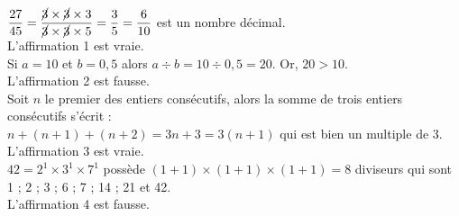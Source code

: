 \ \\ [-5mm]
   $\dfrac{27}{45} =\dfrac{\cancel{3}\times\cancel{3}\times3}{\cancel{3}\times\cancel{3}\times5} =\dfrac35 =\dfrac{6}{10}$ est un nombre décimal. \\ [1mm]
      {\blue L'affirmation 1 est vraie}. \\
   Si $a =10$ et $b =0,5$ alors $a\div b =10\div0,5 =20$. Or, $20>10$. \\
      {\blue L'affirmation 2 est fausse}. \\
   Soit $n$ le premier des entiers consécutifs, alors la somme de trois entiers consécutifs s'écrit : \\
      $n+(n+1)+(n+2) =3n+3 =3(n+1)$ qui est bien un multiple de 3. \\
      {\blue L'affirmation 3 est vraie}. \\
   $42 =2^1\times3^1\times7^1$ possède $(1+1)\times(1+1)\times(1+1) =8$ diviseurs qui sont 1 ; 2 ; 3 ; 6 ; 7 ;  14 ; 21 et 42. \\
      {\blue L'affirmation 4 est fausse}. \\
